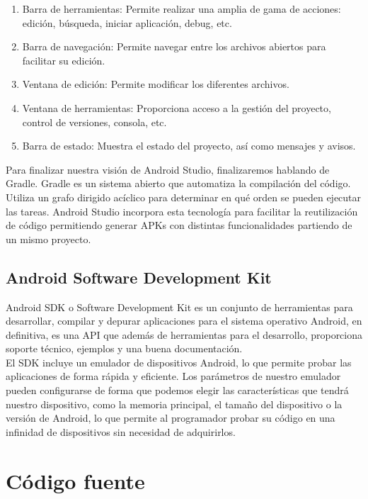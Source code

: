 
\begin{enumerate}
\item Barra de herramientas: Permite realizar una amplia de gama de acciones: edición, búsqueda, iniciar aplicación, debug, etc. 
\item Barra de navegación: Permite navegar entre los archivos abiertos para facilitar su edición.
\item Ventana de edición: Permite modificar los diferentes archivos.
\item Ventana de herramientas: Proporciona acceso a la gestión del proyecto, control de versiones, consola, etc.
\item Barra de estado: Muestra el estado del proyecto, así como mensajes y avisos.
\end{enumerate}

Para finalizar nuestra visión de Android Studio, finalizaremos hablando de Gradle. Gradle es un sistema abierto que automatiza la compilación del código. Utiliza un grafo dirigido acíclico para determinar en qué orden se pueden ejecutar las tareas. Android Studio incorpora esta tecnología para facilitar la reutilización de código permitiendo generar APKs con distintas funcionalidades partiendo de un mismo proyecto.

\subsection{Android Software Development Kit}

Android SDK o Software Development Kit es un conjunto de herramientas para desarrollar, compilar y depurar aplicaciones para el sistema operativo Android, en definitiva, es una API que además de herramientas para el desarrollo, proporciona soporte técnico, ejemplos y una buena documentación.\\

El SDK incluye un emulador de dispositivos Android, lo que permite probar las aplicaciones de forma rápida y eficiente. Los parámetros de nuestro emulador pueden configurarse de forma que podemos elegir las características que tendrá nuestro dispositivo, como la memoria principal, el tamaño del dispositivo o la versión de Android, lo que permite al programador probar su código en una infinidad de dispositivos sin necesidad de adquirirlos.

\section{Código fuente}


